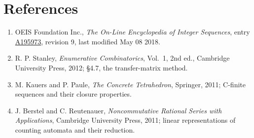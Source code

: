 \documentclass[11pt]{article}
\theoremstyle{definition}
\begin{document}
\section{References}

\begin{enumerate}

\item OEIS Foundation Inc., \emph{The On-Line Encyclopedia of Integer Sequences}, entry \href{https://oeis.org/A195973}{A195973}, revision 9, last modified May 08 2018.

\item R. P. Stanley, \emph{Enumerative Combinatorics}, Vol.~1, 2nd ed., Cambridge University Press, 2012; \S4.7, the transfer-matrix method.

\item M. Kauers and P. Paule, \emph{The Concrete Tetrahedron}, Springer, 2011; C-finite sequences and their closure properties.

\item J. Berstel and C. Reutenauer, \emph{Noncommutative Rational Series with Applications}, Cambridge University Press, 2011; linear representations of counting automata and their reduction.

\end{enumerate}
\end{document}
